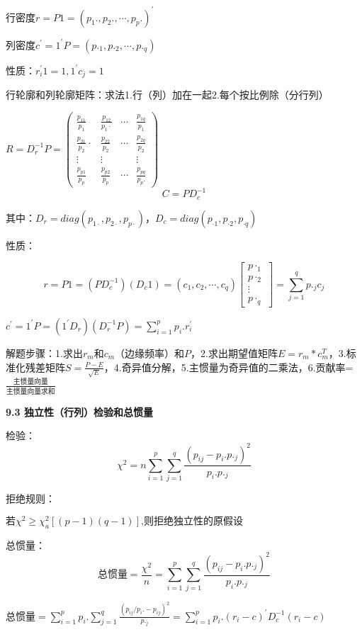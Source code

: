 \documentclass[10pt,a4paper]{ctexart} %
\begin{document}
\begin{multicols*}{3}
		行密度$r=P1=(p_1.,p_2.,\cdots,p_p.)^{\prime}$
		
		列密度$c^{\prime}=1^{\prime}P=(p._1,p._2,\cdots,p._q)$
		
		性质：$r_i^{\prime}1=1, 1^{\prime}c_j=1$
		
		行轮廓和列轮廓矩阵：求法1.行（列）加在一起2.每个按比例除（分行列）
		
		$R=D^{-1}_rP = \left(\begin{array}{cccc}
			\frac{p_{11}}{p_{1}} & \frac{p_{12}}{p_{1} \cdot} & \cdots & \frac{p_{1 q}}{p_{1}} \\
			\frac{p_{21}}{p_{2}} \cdot & \frac{p_{22}}{p_{2}} & \cdots & \frac{p_{2 q}}{p_{2}} \\
			\vdots & \vdots & & \vdots \\
			\frac{p_{p 1}}{p_{p}} & \frac{p_{p 2}}{p_{p}} & \cdots & \frac{p_{p q}}{p_{p} .}
		\end{array}\right)$
		$$C=PD^{-1}_c$$
		
		其中：$D_r=diag(p_{1·},p_{2·},p_{p·})$，$D_c=diag(p_{·1},p_{·2},p_{·q})$
		
		性质：
		
		$$r=P1=(PD_c^{-1})(D_c1)=(c_1,c_2,\cdots,c_q)\begin{bmatrix}p\cdot_1\\p\cdot_2\\\vdots\\p\cdot_q\end{bmatrix}=\sum_{j=1}^qp._jc_j$$
		
		$c^{\prime}=1^{\prime}P=(1^{\prime}D_{r})(D_{r}^{-1}P)=\sum_{i=1}^{p}p_{i}.r_{i}^{\prime}$
		
		解题步骤：1.求出$r_m$和$c_m$（边缘频率）和$P$，2.求出期望值矩阵$E=r_m*c_m^T$，3.标准化残差矩阵$S=\frac{P-E}{\sqrt{E}}$，4.奇异值分解，5.主惯量为奇异值的二乘法，6.贡献率=$\frac{\text{主惯量向量}}{\text{主惯量向量求和}}$
		
		\textbf{9.3 独立性（行列）检验和总惯量}
		
		检验：
		$$\chi^{2}=n\sum_{i=1}^{p}\sum_{j=1}^{q}\frac{(p_{ij}-p_{i}.p._{j})^{2}}{p_{i}.p._{j}}$$
		
		拒绝规则：
		
		$\text{若}\chi^{2}\geqslant\chi_{a}^{2}\left[\left(p-1\right)\left(q-1\right)\right]\text{,则拒绝独立性的原假设}$
		
		总惯量：
		$$\text{总惯量}=\frac{\chi^2}{n}=\sum_{i=1}^p\sum_{j=1}^q\frac{(p_{ij}-p_i.p._j)^2}{p_i.p._j}$$
		
		$\text{总惯量}=\sum_{i=1}^pp_i.\sum_{j=1}^q\frac{(p_{ij}/p_i.-p_{ij})^2}{p._j}=\sum_{i=1}^pp_i.(r_i-c)^{\prime}D_c^{-1}(r_i-c)$
		

\end{multicols*}
\end{document}
